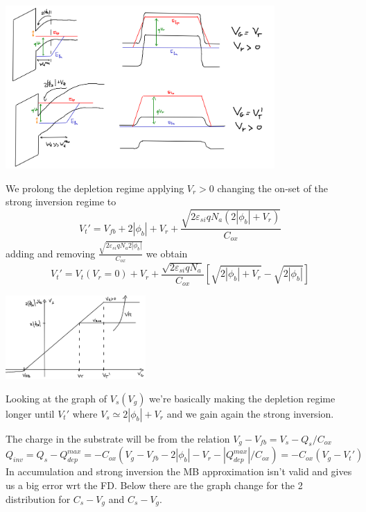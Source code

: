 \centering
\includegraphics[width=0.77\textwidth]{mosring.png}\\
\raggedright
We prolong the depletion regime applying $V_r>0$ changing the on-set of the strong inversion regime to 
\begin{equation}
V_t'=V_{fb}+2|\phi_b|+V_r+\frac{\sqrt{2\varepsilon_{si}qN_a(2|\phi_b|+V_r)}}{C_{ox}}
\end{equation}
adding and removing $\frac{\sqrt{2\varepsilon_{si}qN_a2|\phi_b|}}{C_{ox}}$ we obtain
\begin{equation}
V_t'=V_t(V_r=0)+V_r+\frac{\sqrt{2\varepsilon_{si}qN_a}}{C_{ox}}[\sqrt{2|\phi_b|+V_r}-\sqrt{2|\phi_b|}]
\end{equation}

\centering
\includegraphics[width=0.4\textwidth]{vtprimo.png}\\
\raggedright

Looking at the graph of $V_s(V_g)$ we're basically making the depletion regime longer until $V_t'$ where $V_s\simeq 2|\phi_b|+V_r$ and we gain again the strong inversion.\\
\vspace{3mm}


\vspace{3mm}
The charge in the substrate will be from the relation $V_g-V_{fb}=V_s-Q_s/C_{ox}$ 
\begin{equation}
Q_{inv}=Q_s-Q_{dep}^{max}=-C_{ox}(V_g-V_{fb}-2|\phi_b|-V_r-|Q_{dep}^{max}|/C_{ox})=-C_{ox}(V_g-V_t')
\end{equation}
In accumulation and strong inversion the MB approximation isn't valid and gives us a big error wrt the FD. Below there are the graph change for the 2 distribution for $C_s-V_g$ and $C_s-V_g$.\\

